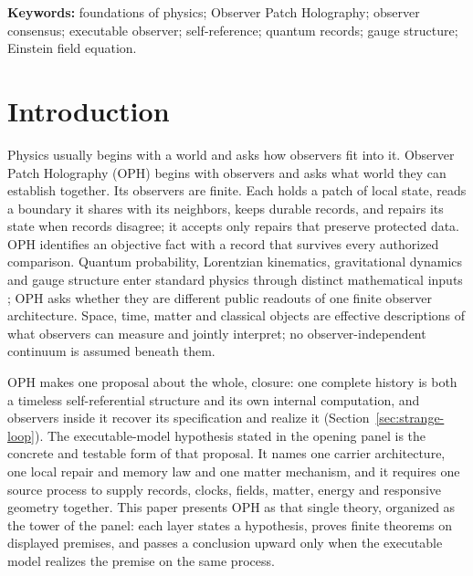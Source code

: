 \documentclass[11pt]{article}
\theoremstyle{definition}
\theoremstyle{remark}
\begin{document}




\vspace{0.5em}
\noindent\textbf{Keywords:} foundations of physics; Observer Patch Holography;
observer consensus; executable observer; self-reference; quantum records;
gauge structure; Einstein field equation.

\section{Introduction}
\label{sec:intro}

Physics usually begins with a world and asks how observers fit into it.
Observer Patch Holography (OPH) begins with observers and asks what world
they can establish together. Its observers are finite. Each holds a patch
of local state, reads a boundary it shares with its neighbors, keeps
durable records, and repairs its state when records disagree; it accepts
only repairs that preserve protected data. OPH identifies an objective
fact with a record that survives every authorized comparison. Quantum
probability, Lorentzian kinematics, gravitational dynamics and gauge
structure enter standard physics through distinct mathematical inputs
\cite{hardy2001,chiribella2011,masanes2011,jacobson95,dr90}; OPH asks
whether they are different public readouts of one finite observer
architecture. Space, time, matter and classical objects are effective
descriptions of what observers can measure and jointly interpret; no
observer-independent continuum is assumed beneath them.

OPH makes one proposal about the whole, closure: one complete history is
both a timeless self-referential structure and its own internal computation,
and observers inside it recover its specification and realize it
(Section~\ref{sec:strange-loop}). The executable-model hypothesis stated in
the opening panel is the concrete and testable form of that proposal. It
names one carrier architecture, one local repair and memory law and one
matter mechanism, and it requires one source process to supply records,
clocks, fields, matter, energy and responsive geometry together. This paper
presents OPH as that single theory, organized as the tower of the panel:
each layer states a hypothesis, proves finite theorems on displayed
premises, and passes a conclusion upward only when the executable model
realizes the premise on the same process.
\end{document}
